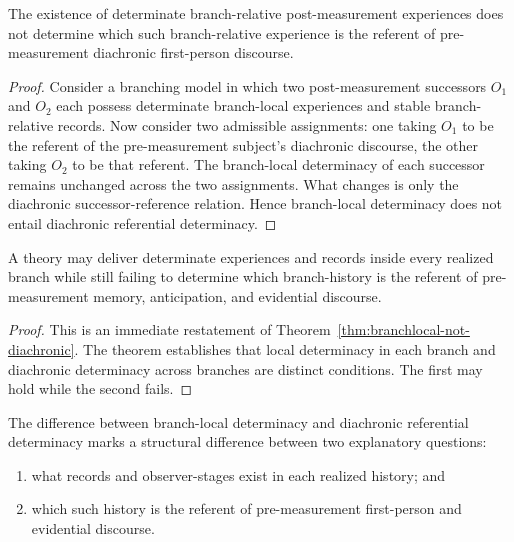 \begin{lemma}
\label{thm:branchlocal-not-diachronic}
\label{lem:branchrelative-not-diachronic}
The existence of determinate branch-relative post-measurement experiences does not determine which such branch-relative experience is the referent of pre-measurement diachronic first-person discourse.
\end{lemma}

\begin{proof}
Consider a branching model in which two post-measurement successors $O_1$ and $O_2$ each possess determinate branch-local experiences and stable branch-relative records. Now consider two admissible assignments: one taking $O_1$ to be the referent of the pre-measurement subject's diachronic discourse, the other taking $O_2$ to be that referent. The branch-local determinacy of each successor remains unchanged across the two assignments. What changes is only the diachronic successor-reference relation. Hence branch-local determinacy does not entail diachronic referential determinacy.
\end{proof}

\begin{corollary}
A theory may deliver determinate experiences and records inside every realized branch while still
failing to determine which branch-history is the referent of pre-measurement memory, anticipation,
and evidential discourse.
\end{corollary}

\begin{proof}
This is an immediate restatement of
Theorem~\ref{thm:branchlocal-not-diachronic}. The theorem establishes that local determinacy in
 each branch and diachronic determinacy across branches are distinct conditions. The first may hold
while the second fails.
\end{proof}

\begin{proposition}
The difference between branch-local determinacy and diachronic referential determinacy marks a structural difference between two explanatory questions:
\begin{enumerate}
    \item what records and observer-stages exist in each realized history; and
    \item which such history is the referent of pre-measurement first-person and evidential discourse.
\end{enumerate}
\end{proposition}

